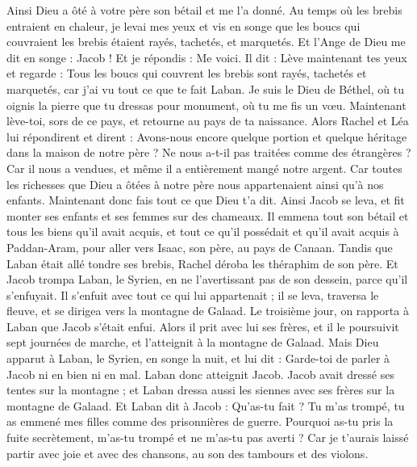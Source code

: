 \begin{multicols}{2}
Ainsi Dieu a ôté à votre père son bétail et me l'a donné.
Au temps où les brebis entraient en chaleur, je levai mes yeux et vis en songe que les boucs qui couvraient les brebis étaient rayés, tachetés, et marquetés.
Et l'Ange de Dieu me dit en songe : Jacob ! Et je répondis : Me voici.
Il dit : Lève maintenant tes yeux et regarde : Tous les boucs qui couvrent les brebis sont rayés, tachetés et marquetés, car j'ai vu tout ce que te fait Laban.
Je suis le Dieu de Béthel, où tu oignis la pierre que tu dressas pour monument, où tu me fis un vœu.  Maintenant lève-toi, sors de ce pays, et retourne au pays de ta naissance.
Alors Rachel et Léa lui répondirent et dirent : Avons-nous encore quelque portion et quelque héritage dans la maison de notre père ?
Ne nous a-t-il pas traitées comme des étrangères ? Car il nous a vendues, et même il a entièrement mangé notre argent.
Car toutes les richesses que Dieu a ôtées à notre père nous appartenaient ainsi qu’à nos enfants. Maintenant donc fais tout ce que Dieu t'a dit.
Ainsi Jacob se leva, et fit monter ses enfants et ses femmes sur des chameaux.
Il emmena tout son bétail et tous les biens qu'il avait acquis, et tout ce qu'il possédait et qu'il avait acquis à Paddan-Aram, pour aller vers Isaac, son père, au pays de Canaan.
Tandis que Laban était allé tondre ses brebis, Rachel déroba les théraphim de son père.
Et Jacob trompa Laban, le Syrien, en ne l’avertissant pas de son dessein, parce qu'il s'enfuyait.
Il s'enfuit avec tout ce qui lui appartenait ; il se leva, traversa le fleuve, et se dirigea vers la montagne de Galaad.
Le troisième jour, on rapporta à Laban que Jacob s’était enfui.
Alors il prit avec lui ses frères, et il le poursuivit sept journées de marche, et l'atteignit à la montagne de Galaad.
Mais Dieu apparut à Laban, le Syrien, en songe la nuit, et lui dit : Garde-toi de parler à Jacob ni en bien ni en mal.
Laban donc atteignit Jacob. Jacob avait dressé ses tentes sur la montagne ; et Laban dressa aussi les siennes avec ses frères sur la montagne de Galaad.
Et Laban dit à Jacob : Qu'as-tu fait ? Tu m’as trompé, tu as emmené mes filles comme des prisonnières de guerre.
Pourquoi as-tu pris la fuite secrètement, m’as-tu trompé et ne m’as-tu pas averti ? Car je t'aurais laissé partir avec joie et avec des chansons, au son des tambours et des violons.

\end{multicols}
